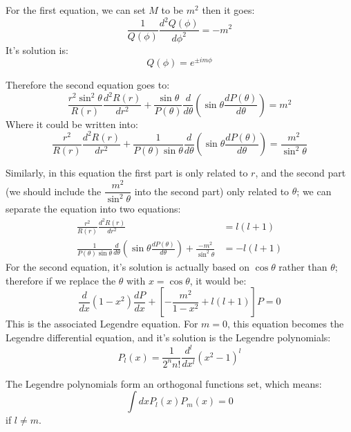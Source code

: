 For the first equation, we can set $M$ to be $m^{2}$ then it goes:
\begin{equation}
 \frac{1}{Q(\phi)}\frac{d^{2} Q(\phi)}{d \phi^{2}} = -m^{2}
\end{equation}
It's solution is:
\begin{equation}
 Q(\phi) = e^{\pm im\phi}
\end{equation}

Therefore the second equation goes to:
\begin{equation}
 \frac{r^{2}\sin^{2} \theta}{R(r)}\frac{d^{2} R(r)}{dr^{2}} +
\frac{\sin \theta}{P(\theta)}\frac{d }{d \theta}
(\sin \theta \frac{d P(\theta)}{d \theta}) = m^{2}
\end{equation}
Where it could be written into:
\begin{equation}
 \frac{r^{2}}{R(r)}\frac{d^{2} R(r)}{dr^{2}} +
\frac{1}{P(\theta)\sin \theta}\frac{d }{d \theta}
(\sin \theta \frac{d P(\theta)}{d \theta}) = \frac{m^{2}}{\sin^{2} \theta}
\end{equation}

Similarly, in this equation the first part is only related to $r$,
and the second part (we should include the $\dfrac{m^{2}}{\sin^{2} \theta}$
into the second part) only related to $\theta$; we can separate the equation
into two equations:
\begin{align}
 \frac{r^{2}}{R(r)}\frac{d^{2} R(r)}{dr^{2}} &= l(l+1) \nonumber \\
 \frac{1}{P(\theta)\sin \theta}\frac{d }{d \theta}
(\sin \theta \frac{d P(\theta)}{d \theta}) + \frac{-m^{2}}{\sin^{2} \theta}
&= -l(l+1)
\end{align}
For the second equation, it's solution is actually based on $\cos \theta$
rather than $\theta$; therefore if we replace the $\theta$ with
$x = \cos \theta$, it would be:
\begin{equation}
\frac{d }{d x}(1-x^{2})\frac{d P}{d x} + [-\frac{m^{2}}{1-x^{2}}+l(l+1)]P = 0
\end{equation}
This is the associated Legendre equation. For $m=0$, this equation becomes
the Legendre differential equation, and it's solution is the Legendre polynomials:
\begin{equation}
 P_{l}(x) = \frac{1}{2^{n}n!}\frac{d^{l}}{dx^{l}}(x^{2}-1)^{l}
\end{equation}

The Legendre polynomials form an orthogonal functions set, which means:
\begin{equation}
 \int dx P_{l}(x) P_{m}(x) = 0
\end{equation}
if $l \neq m$.

